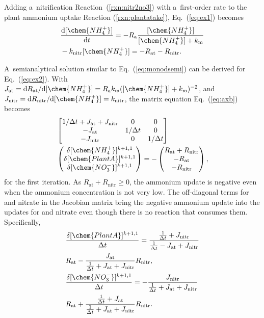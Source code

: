 \documentclass[gmd,noline]{copernicus}
\begin{document}
      Adding a~nitrification Reaction~(\ref{rxn:nitr2no3}) with
      a~first-order rate to the plant ammonium uptake Reaction
      (\ref{rxn:plantatake}), Eq.~(\ref{eq:ex1}) becomes
\begin{align}
 &
\frac{\mathrm{d} [\chem{NH_4^+}]}{\mathrm{d}t} = - R_\mathrm{a}
\frac{[\chem{NH_4^+}]}{[\chem{NH_4^+}]+k_\mathrm{m}} \nonumber\\&-
k_{\text{nitr}} [\chem{NH_4^+}] = -R_{\text{at}} - R_{\text{nitr}}.
\label{eq:ex2}
\end{align}%

      A~semianalytical solution similar to Eq.~(\ref{eq:monodsemi}) can be
      derived for Eq.~(\ref{eq:ex2}). With $J_{\text{at}} = \mathrm{d}
      R_{\text{at}}/\mathrm{d} [\chem{NH_4^+}] =
      R_\mathrm{a}k_\mathrm{m}([\chem{NH_4^+}] + k_\mathrm{m})^{-2}$, and
      $J_{\text{nitr}} = \mathrm{d} R_{\text{nitr}}/\mathrm{d}
      [\chem{NH_4^+}]=k_{\text{nitr}}$, the matrix equation
      Eq.~(\ref{eq:axb}) becomes
\begin{align}
 &
\left[
\begin{matrix}
1/\Delta t + J_{\text{at}} + J_{\text{nitr}} & 0 & 0 \\
-J_{\text{at}} & 1/\Delta t & 0 \\
-J_{\text{nitr}} & 0 & 1/\Delta t \\
\end{matrix}
\right]\nonumber\\& \left(\begin{matrix}
\delta [\chem{NH_4^+}]^{k+1,1} \\
\delta [\chem{PlantA}]^{k+1,1} \\
\delta [\chem{NO_3^-}]^{k+1,1}
\end{matrix}
\right)
=-
\left(\begin{matrix}
R_{\text{at}} + R_{\text{nitr}} \\
-R_{\text{at}} \\
-R_{\text{nitr}}
\end{matrix}
\right),
\label{eq:test2}
\end{align}%
      for the first iteration. As $R_{\text{at}} + R_{\text{nitr}} \geq 0$,
      the ammonium update is negative even when the ammonium concentration
      is not very low. The off-diagonal terms for  and nitrate
      in the Jacobian matrix bring the negative ammonium update into the
      updates for  and nitrate even though there is no reaction
      that consumes them. Specifically,
\begin{align}
 &
\frac{\delta [\chem{PlantA}]^{k+1,1}}{\Delta t} = \frac{\frac{1}{\Delta t} +
J_{\text{nitr}}}{\frac{1}{\Delta t} - J_{\text{at}} +
J_{\text{nitr}}}\nonumber\\& R_{\text{at}} - \frac{J_{\text{at}}}
{\frac{1}{\Delta t} + J_{\text{at}} + J_{\text{nitr}}} R_{\text{nitr}},
\\
& \frac{\delta [\chem{NO_3^-}]^{k+1,1}}{\Delta t} =
-\frac{J_{\text{nitr}}}{\frac{1}{\Delta t} + J_{\text{at}} + J_{\text{nitr}}}
\nonumber\\&R_{\text{at}} + \frac{\frac{1}{\Delta t} + J_{\text{at}}}
{\frac{1}{\Delta t} + J_{\text{at}} + J_{\text{nitr}}} R_{\text{nitr}}.
\end{align}%
\end{document}
